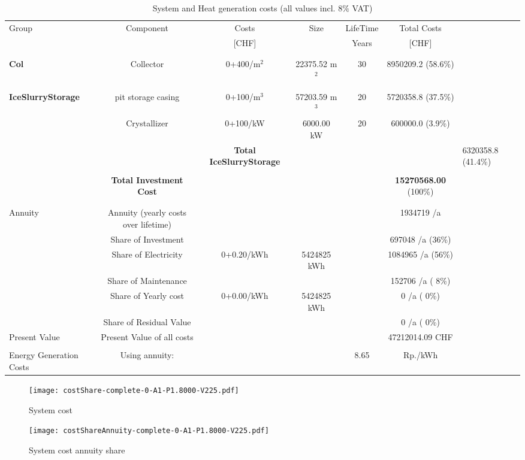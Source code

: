 \documentclass[english]{SPFShortReport}
\begin{document}
\begin{table}[!ht]
\centering
\caption{System and Heat generation costs (all values incl. 8$\%$ VAT) }
\begin{adjustbox}{max width =\textwidth}
\begin{tabular}{l | c c c c c } 
\hline
\hline
Group &Component &Costs &Size &LifeTime &Total Costs \\ 
 & &[CHF] & &Years &[CHF]\\ 
\hline
\\
\hline \\
\textbf{Col} & Collector & 0+400/m$^2$ & 22375.52 m$^2$ & 30 & 8950209.2 (58.6\%) \\
\hline \\
\hline \\
\textbf{IceSlurryStorage} & pit storage casing & 0+100/m$^3$ & 57203.59 m$^3$ & 20 & 5720358.8 (37.5\%) \\
 & Crystallizer & 0+100/kW & 6000.00 kW & 20 & 600000.0 (3.9\%) \\
&
 & \textbf{Total IceSlurryStorage} & & & & 6320358.8 (41.4\%) \\
\hline \\
 & \textbf{Total Investment Cost} & & & & \textbf{15270568.00} (100\%) \\ 
\hline \\ 
\hline \\ 
Annuity & Annuity (yearly costs over lifetime)  &&& & 1934719 /a  \\
 & Share of Investment & &&& 697048 /a (36\%) \\
 & Share of Electricity & 0+0.20/kWh & 5424825 kWh &  & 1084965 /a (56\%)\\
 & Share of Maintenance & &&& 152706 /a ( 8\%)\\ 
 & Share of Yearly cost & 0+0.00/kWh & 5424825 kWh & &  0 /a ( 0\%)\\
 & Share of Residual Value &&& &  0 /a ( 0\%)\\
Present Value  & Present Value of all costs  & &&& 47212014.09 CHF \\
\hline \\ 
 Energy Generation Costs & Using annuity: &&& 8.65 & Rp./kWh \\
\hline
\hline
\end{tabular}
\end{adjustbox}
\label{CostsTable}
\end{table}
\begin{figure}[!htbp]
\begin{center}
\texttt{[image: costShare-complete-0-A1-P1.8000-V225.pdf]}
\caption{System cost}
\label{systemCost}
\end{center}
\end{figure}
\begin{figure}[!htbp]
\begin{center}
\texttt{[image: costShareAnnuity-complete-0-A1-P1.8000-V225.pdf]}
\caption{System cost annuity share}
\label{systemCostannuity}
\end{center}
\end{figure}
\end{document}
